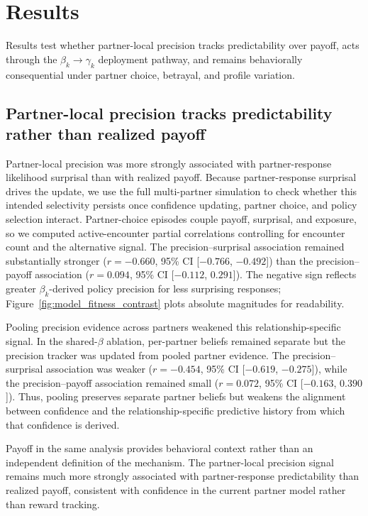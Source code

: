 \section{Results}
\label{sec:results}

Results test whether partner-local precision tracks predictability over payoff, acts through the \(\beta_k \rightarrow \gamma_k\) deployment pathway, and remains behaviorally consequential under partner choice, betrayal, and profile variation.

\subsection{Partner-local precision tracks predictability rather than realized payoff}
\label{sec:predictability_value}

Partner-local precision was more strongly associated with partner-response likelihood surprisal than with realized payoff. Because partner-response surprisal drives the update, we use the full multi-partner simulation to check whether this intended selectivity persists once confidence updating, partner choice, and policy selection interact. Partner-choice episodes couple payoff, surprisal, and exposure, so we computed active-encounter partial correlations controlling for encounter count and the alternative signal. The precision--surprisal association remained substantially stronger ($r=-0.660$, 95\% CI [$-0.766$, $-0.492$]) than the precision--payoff association ($r=0.094$, 95\% CI [$-0.112$, $0.291$]). The negative sign reflects greater $\beta_k$-derived policy precision for less surprising responses; Figure~\ref{fig:model_fitness_contrast} plots absolute magnitudes for readability.

Pooling precision evidence across partners weakened this relationship-specific signal. In the shared-$\beta$ ablation, per-partner beliefs remained separate but the precision tracker was updated from pooled partner evidence. The precision--surprisal association was weaker ($r=-0.454$, 95\% CI [$-0.619$, $-0.275$]), while the precision--payoff association remained small ($r=0.072$, 95\% CI [$-0.163$, $0.390$]). Thus, pooling preserves separate partner beliefs but weakens the alignment between confidence and the relationship-specific predictive history from which that confidence is derived.

Payoff in the same analysis provides behavioral context rather than an independent definition of the mechanism. The partner-local precision signal remains much more strongly associated with partner-response predictability than realized payoff, consistent with confidence in the current partner model rather than reward tracking.

